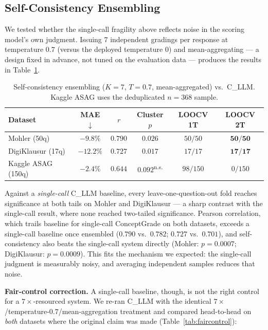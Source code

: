 \documentclass[conference]{IEEEtran}
\begin{document}
\subsection{Self-Consistency Ensembling}
\label{sec:selfconsistency}
We tested whether the single-call fragility above reflects noise in the
scoring model's own judgment. Issuing 7 independent gradings per response at
temperature $0.7$ (versus the deployed temperature $0$) and mean-aggregating
--- a design fixed in advance, not tuned on the evaluation data --- produces
the results in Table~\ref{tab:selfconsistency}.

\begin{table}[t]
\caption{Self-consistency ensembling ($K{=}7$, $T{=}0.7$, mean-aggregated)
vs.\ C\_LLM. Kaggle ASAG uses the deduplicated $n=368$ sample.}
\label{tab:selfconsistency}
\centering
\footnotesize
\setlength{\tabcolsep}{4pt}
\begin{tabular}{lccccc}
\toprule
\textbf{Dataset} & MAE$\downarrow$ & $r$ & Cluster $p$ & LOOCV 1T & LOOCV 2T \\
\midrule
Mohler (50q) & $-9.8\%$ & $0.790$ & $0.026$ & $50/50$ & $\mathbf{50/50}$ \\
DigiKlausur (17q) & $-12.2\%$ & $0.727$ & $0.017$ & $17/17$ & $\mathbf{17/17}$ \\
Kaggle ASAG (150q) & $-2.4\%$ & $0.644$ & $0.092$\textsuperscript{n.s.} & $98/150$ & $0/150$ \\
\bottomrule
\end{tabular}
\end{table}

Against a \emph{single-call} C\_LLM baseline, every leave-one-question-out
fold reaches significance at both tails on Mohler and DigiKlausur — a
sharp contrast with the single-call result, where none reached
two-tailed significance. Pearson correlation, which trails baseline for
single-call ConceptGrade on both datasets, exceeds a single-call
baseline once ensembled ($0.790$ vs.\ $0.782$; $0.727$ vs.\ $0.701$),
and self-consistency also beats the single-call system directly
(Mohler: $p=0.0007$; DigiKlausur: $p=0.0009$). This fits the mechanism
we expected: the single-call judgment is measurably noisy, and
averaging independent samples reduces that noise.

\textbf{Fair-control correction.} A single-call baseline, though, is
not the right control for a $7\times$-resourced system. We re-ran
C\_LLM with the identical $7\times$/temperature-$0.7$/mean-aggregation
treatment and compared head-to-head on \emph{both} datasets where the
original claim was made (Table~\ref{tab:faircontrol}):
\end{document}
